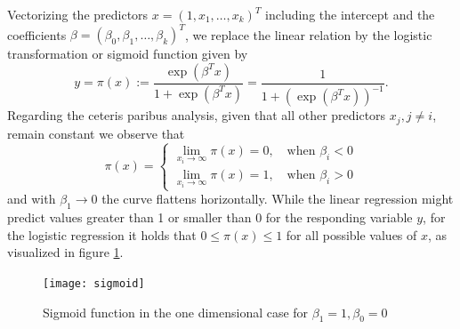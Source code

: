 \documentclass[a4paper, 11pt]{scrreprt}
\begin{document}
Vectorizing the predictors $x = (1, x_1, \ldots, x_k)^T$ including the intercept and the coefficients $\beta = (\beta_0, \beta_1, \ldots, \beta_k)^T$, we replace the linear relation by the logistic transformation or sigmoid function given by
\begin{equation}
y = \pi(x) := \frac{\exp(\beta^T x)}{1+\exp(\beta^T x)} = \frac{1}{1+(\exp(\beta^T x))^{-1}}.
\end{equation}
Regarding the ceteris paribus analysis, given that all other predictors $x_j, j \neq i$, remain constant we observe that 
\begin{equation} 
\pi(x) =  \begin{cases}
\lim\limits_{x_i \to \infty} \pi(x) = 0, \quad \text{when } \beta_i < 0  \\
\lim\limits_{x_i \to \infty} \pi(x) = 1, \quad \text{when } \beta_i > 0 
\end{cases}
\end{equation}
and with $\beta_1 \to 0$ the curve flattens horizontally. 
While the linear regression might predict values greater than 1 or smaller than 0 for the responding variable $y$, for the logistic regression it holds that $0 \leq \pi(x) \leq 1$ for all possible values of $x$, as visualized in figure \ref{sigmoid}.

\begin{figure}[H]
	\texttt{[image: sigmoid]}
	\centering
	\caption{Sigmoid function in the one dimensional case for $\beta_1=1, \beta_0 =0$}
	\label{sigmoid}
\end{figure}

\bigskip
\end{document}
